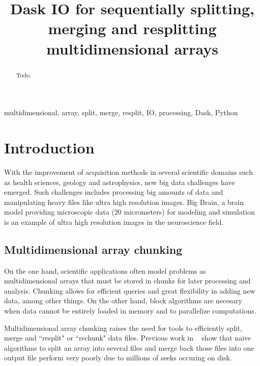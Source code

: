 \documentclass[conference]{IEEEtran}
\begin{document}
\title{ Dask IO for sequentially splitting, merging and resplitting multidimensional arrays }

\author{
}

\maketitle

\begin{abstract}
Todo.
\end{abstract}

\begin{IEEEkeywords}
multidimensional, array, split, merge, resplit, IO, processing, Dask, Python
\end{IEEEkeywords}

\section{Introduction}
With the improvement of acquisition methods in several scientific domains such as
health sciences, geology and astrophysics, new big data challenges have emerged.
Such challenges includes processing big amounts of data and manipulating heavy
files like ultra high resolution images. Big Brain, a brain model providing
microscopic data (20 micrometers) for modeling and simulation~\cite{Amunts1472}
is an example of ultra high resolution images in the neuroscience field.

\subsection{Multidimensional array chunking}
On the one hand, scientific applications often model problems as
multidimensional arrays that must be stored in chunks for later processing and analysis.
Chunking allows for efficient queries and great flexibility in adding new data, among other things.
On the other hand, block algorithms are necesary when data cannot be entirely
loaded in memory and to parallelize computations.

Multidimensional array chunking raises the need for tools to efficiently split,
merge and ``resplit" or ``rechunk" data files. Previous work in ~\cite{seqalgorithms}
show that naive algorithms to split an array into several files and merge back those
files into one output file perform very poorly due to millions of seeks occuring on disk.
\end{document}
